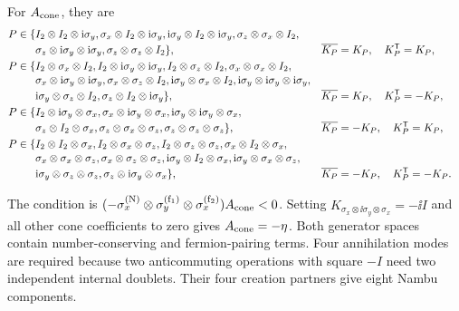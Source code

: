 \begin{samepage}
For \(A_{\rm cone}\), they are
\begin{align*}
P\in\{&I_2\otimes I_2\otimes\mathrm{i}\sigma_y,
\sigma_x\otimes I_2\otimes\mathrm{i}\sigma_y,
\mathrm{i}\sigma_y\otimes I_2\otimes\mathrm{i}\sigma_y,
\sigma_z\otimes\sigma_x\otimes I_2,\\[-2pt]
&\sigma_z\otimes\mathrm{i}\sigma_y\otimes\mathrm{i}\sigma_y,
\sigma_z\otimes\sigma_z\otimes I_2\},
&&\overline{K_P}=K_P,\quad K_P^{\mathsf{T}}=K_P,\\
P\in\{&I_2\otimes\sigma_x\otimes I_2,
I_2\otimes\mathrm{i}\sigma_y\otimes\mathrm{i}\sigma_y,
I_2\otimes\sigma_z\otimes I_2,
\sigma_x\otimes\sigma_x\otimes I_2,\\[-2pt]
&\sigma_x\otimes\mathrm{i}\sigma_y\otimes\mathrm{i}\sigma_y,
\sigma_x\otimes\sigma_z\otimes I_2,
\mathrm{i}\sigma_y\otimes\sigma_x\otimes I_2,
\mathrm{i}\sigma_y\otimes\mathrm{i}\sigma_y\otimes\mathrm{i}\sigma_y,\\[-2pt]
&\mathrm{i}\sigma_y\otimes\sigma_z\otimes I_2,
\sigma_z\otimes I_2\otimes\mathrm{i}\sigma_y\},
&&\overline{K_P}=K_P,\quad K_P^{\mathsf{T}}=-K_P,\\
P\in\{&I_2\otimes\mathrm{i}\sigma_y\otimes\sigma_x,
\sigma_x\otimes\mathrm{i}\sigma_y\otimes\sigma_x,
\mathrm{i}\sigma_y\otimes\mathrm{i}\sigma_y\otimes\sigma_x,\\[-2pt]
&\sigma_z\otimes I_2\otimes\sigma_x,
\sigma_z\otimes\sigma_x\otimes\sigma_z,
\sigma_z\otimes\sigma_z\otimes\sigma_z\},
&&\overline{K_P}=-K_P,\quad K_P^{\mathsf{T}}=K_P,\\
P\in\{&I_2\otimes I_2\otimes\sigma_x,
I_2\otimes\sigma_x\otimes\sigma_z,
I_2\otimes\sigma_z\otimes\sigma_z,
\sigma_x\otimes I_2\otimes\sigma_x,\\[-2pt]
&\sigma_x\otimes\sigma_x\otimes\sigma_z,
\sigma_x\otimes\sigma_z\otimes\sigma_z,
\mathrm{i}\sigma_y\otimes I_2\otimes\sigma_x,
\mathrm{i}\sigma_y\otimes\sigma_x\otimes\sigma_z,\\[-2pt]
&\mathrm{i}\sigma_y\otimes\sigma_z\otimes\sigma_z,
\sigma_z\otimes\mathrm{i}\sigma_y\otimes\sigma_x\},
&&\overline{K_P}=-K_P,\quad K_P^{\mathsf{T}}=-K_P.
\end{align*}
\end{samepage}
The condition is
\((-\sigma_x^{({\rm N})}\otimes\sigma_y^{({\rm f}_1)}\otimes\sigma_x^{({\rm f}_2)})A_{\rm cone}<0\).  Setting
\(K_{\sigma_x\otimes\ii\sigma_y\otimes\sigma_x}=-\ii I\) and all other cone coefficients to zero gives \(A_{\rm cone}=-\eta\).  Both generator spaces contain number-conserving and fermion-pairing terms.  Four annihilation modes are required because two anticommuting operations with square \(-I\) need two independent internal doublets.  Their four creation partners give eight Nambu components.

